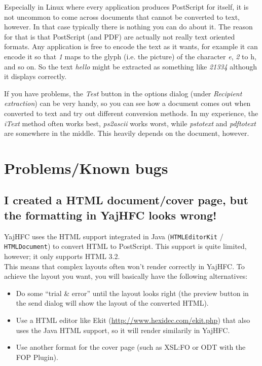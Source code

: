 \documentclass[a4paper,10pt]{scrartcl}
\begin{document}
Especially in Linux where every application produces PostScript for itself, it is not uncommon to come across documents that cannot be converted to text, however.
In that case typically there is nothing you can do about it. The reason for that is that PostScript (and PDF) are actually not really text oriented formats.
Any application is free to encode the text as it wants, for example it can encode it so that \textit{1} maps to the glyph (i.e. the picture) of the character \textit{e}, \textit{2} to {h}, 
and so on. So the text \textit{hello} might be extracted as something like \textit{21334} although it displays correctly.

If you have problems, the \textit{Test} button in the options dialog (under \textit{Recipient extraction}) can be very handy, so you can see how a document comes out when converted to text and try out different conversion methods.
In my experience, the \textit{iText} method often works best, \textit{ps2ascii} works worst, while \textit{pstotext} and \textit{pdftotext} are somewhere in the middle.
This heavily depends on the document, however.


\section{Problems/Known bugs}

\subsection{I created a HTML document/cover page, but the formatting in YajHFC looks wrong!}

YajHFC uses the HTML support integrated in Java (\texttt{HTMLEditorKit} / \texttt{HTMLDocument}) to convert HTML to PostScript. This support is quite limited, however; it only supports HTML 3.2.\\
This means that complex layouts often won't render correctly in YajHFC.
To achieve the layout you want, you will basically have the following alternatives:

\begin{itemize}
 \item Do some ``trial \& error'' until the layout looks right (the preview button in the send dialog will show the layout of the converted HTML).
 \item Use a HTML editor like Ekit (\url{http://www.hexidec.com/ekit.php}) that also uses the Java HTML support, so it will render similarily in YajHFC.
 \item Use another format for the cover page (such as XSL:FO or ODT with the FOP Plugin).
\end{itemize}
\end{document}
